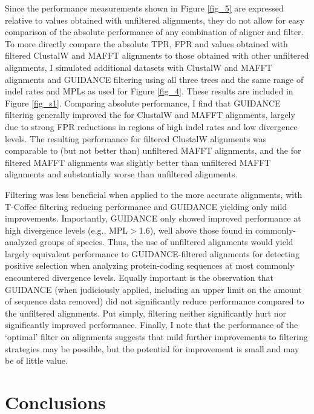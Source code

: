Since the performance measurements shown in Figure \ref{fig_5}
  are expressed relative to values obtained with unfiltered
  alignments, they do not allow for easy comparison of the absolute
  performance of any combination of aligner and filter. To more
  directly compare the absolute TPR, FPR and \tpr values obtained with
  filtered ClustalW and MAFFT alignments to those obtained with other
  unfiltered alignments, I simulated additional datasets with
  ClustalW and MAFFT alignments and GUIDANCE filtering using all three
  trees and the same range of indel rates and MPLs as used for Figure
  \ref{fig_4}. These results are included in Figure \ref{fig_s1}. Comparing absolute performance, I find that GUIDANCE filtering
  generally improved the \tpr for ClustalW and MAFFT alignments,
  largely due to strong FPR reductions in regions of high indel rates
  and low divergence levels. The resulting \tpr performance for
  filtered ClustalW alignments was comparable to (but not better than)
  unfiltered MAFFT alignments, and the \tpr for filtered MAFFT
  alignments was slightly better than unfiltered MAFFT alignments and
  substantially worse than unfiltered \pranka alignments.

Filtering was less beneficial when applied to the more accurate
\prankc alignments, with T-Coffee filtering reducing performance and
GUIDANCE yielding only mild \tpr improvements. Importantly, GUIDANCE
only showed improved performance at high divergence levels (e.g.,
MPL$>$1.6), well above those found in commonly-analyzed groups of
species. Thus, the use of unfiltered \prankc alignments would yield
largely equivalent performance to GUIDANCE-filtered alignments for
detecting \sw positive selection when analyzing protein-coding
sequences at most commonly encountered divergence levels. Equally
important is the observation that GUIDANCE (when judiciously applied,
including an upper limit on the amount of sequence data removed) did
not significantly reduce performance compared to the unfiltered
alignments. Put simply, filtering neither significantly hurt nor
significantly improved performance. Finally, I note that the
performance of the `optimal' filter on \prankc alignments suggests
that mild further improvements to filtering strategies may be
possible, but the potential for improvement is small and may be of
little value.

\section{Conclusions}

